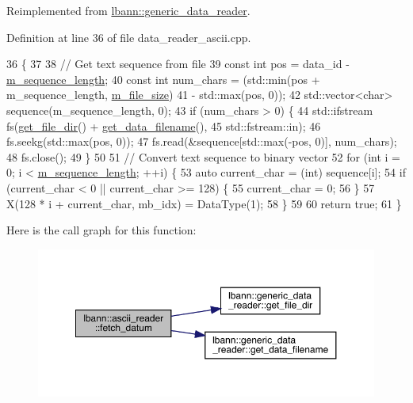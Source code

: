 Reimplemented from \hyperlink{classlbann_1_1generic__data__reader_a0a3cd87ed4a7057df185e0087f2d21c1}{lbann\+::generic\+\_\+data\+\_\+reader}.



Definition at line 36 of file data\+\_\+reader\+\_\+ascii.\+cpp.


\begin{DoxyCode}
36                                                                        \{
37 
38   \textcolor{comment}{// Get text sequence from file}
39   \textcolor{keyword}{const} \textcolor{keywordtype}{int} pos = data\_id - \hyperlink{classlbann_1_1ascii__reader_a5788fa7418a086de968929d0d4cb4fa4}{m\_sequence\_length};
40   \textcolor{keyword}{const} \textcolor{keywordtype}{int} num\_chars = (std::min(pos + m\_sequence\_length, \hyperlink{classlbann_1_1ascii__reader_af684694c8c7faef296bf5af2530471f3}{m\_file\_size})
41                          - std::max(pos, 0));
42   std::vector<char> sequence(m\_sequence\_length, 0);
43   \textcolor{keywordflow}{if} (num\_chars > 0) \{
44     std::ifstream fs(\hyperlink{classlbann_1_1generic__data__reader_ab4c6c2d4ba40ece809ce896828c8ff03}{get\_file\_dir}() + \hyperlink{classlbann_1_1generic__data__reader_a56664e1b43f3fe923cf6d652f14b40a9}{get\_data\_filename}(),
45                      std::fstream::in);
46     fs.seekg(std::max(pos, 0));
47     fs.read(&sequence[std::max(-pos, 0)], num\_chars);
48     fs.close();
49   \}
50 
51   \textcolor{comment}{// Convert text sequence to binary vector}
52   \textcolor{keywordflow}{for} (\textcolor{keywordtype}{int} i = 0; i < \hyperlink{classlbann_1_1ascii__reader_a5788fa7418a086de968929d0d4cb4fa4}{m\_sequence\_length}; ++i) \{
53     \textcolor{keyword}{auto} current\_char = (int) sequence[i];
54     \textcolor{keywordflow}{if} (current\_char < 0 || current\_char >= 128) \{
55       current\_char = 0;
56     \}
57     X(128 * i + current\_char, mb\_idx) = DataType(1);
58   \}
59 
60   \textcolor{keywordflow}{return} \textcolor{keyword}{true};
61 \}
\end{DoxyCode}
Here is the call graph for this function\+:\nopagebreak
\begin{figure}[H]
\begin{center}
\leavevmode
\includegraphics[width=350pt]{classlbann_1_1ascii__reader_a5b56d66d5f2c175d580ef213c901fef0_cgraph}
\end{center}
\end{figure}
